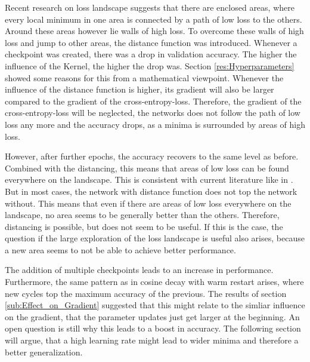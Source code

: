 Recent research on loss landscape suggests that there are enclosed areas, where
every local minimum in one area is connected by a path of low loss to the
others. Around these areas however lie walls of high loss. To overcome these
walls of high loss and jump to other areas, the distance function was
introduced. Whenever a checkpoint was created, there was a drop in validation
accuracy. The higher the influence of the Kernel, the higher the drop was.
Section \ref{res:Hyperparameters} showed some reasons for this from a
mathematical viewpoint. Whenever the influence of the distance function is
higher, its gradient will also be larger compared to the gradient of the
cross-entropy-loss. Therefore, the gradient of the cross-entropy-loss will be
neglected, the networks does not follow the path of low loss any more and the
accuracy drops, as a minima is surrounded by areas of high loss.

However, after further epochs, the accuracy recovers to the same level as
before. Combined with the distancing, this means that areas of low loss can be
found everywhere on the landscape. This is consistent with current literature
like in \cite{he2020piecewise}. But in most cases, the network with distance
function does not top the network without. This means that even if there are
areas of low loss everywhere on the landscape, no area seems to be generally better
than the others. Therefore, distancing is possible, but does not seem to be
useful. If this is the case, the question if the large exploration of the loss
landscape is useful also arises, because a new area seems to not be able to
achieve better performance. 
\newline

The addition of multiple checkpoints leads to an increase in performance.
Furthermore, the same pattern as in cosine decay with warm restart arises, where new cycles top
the maximum accuracy of the previous. The results of section
\ref{sub:Effect_on_Gradient} suggested that this might relate to the simliar
influence on the gradient, that the parameter updates just get larger at the
beginning. An open question is still why this leads to a boost in accuracy. The
following section will argue, that a high learning rate might lead to wider
minima and therefore a better generalization.

